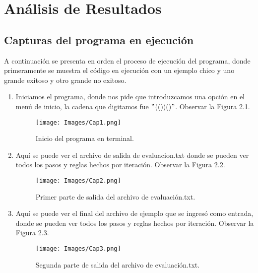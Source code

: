 \chapter{Análisis de Resultados}
\section{Capturas del programa en ejecución}

A continuación se presenta en orden el proceso de ejecución del programa, donde primeramente se muestra el código en ejecución con un ejemplo chico y uno grande exitoso y otro grande no exitoso.\newline
\newpage

\begin{enumerate}
\item Iniciamos el programa, donde nos pide que introduzcamos una opción en el menú de inicio, la cadena que digitamos fue $"$(())()$"$. Observar la Figura 2.1.

\begin{figure}[h]
\begin{minipage}{0.3\textwidth}
    \texttt{[image: Images/Cap1.png]}
\end{minipage}
\caption{Inicio del programa en terminal.}
\label{fig:imagen}
\end{figure}
\newpage
\item Aquí se puede ver el archivo de salida de evaluacion.txt donde se pueden ver todos los pasos y reglas hechos por iteración.  Observar la Figura 2.2.\newline
\begin{figure}[h]
\begin{minipage}{0.3\textwidth}
    \texttt{[image: Images/Cap2.png]}
\end{minipage}
\caption{Primer parte de salida del archivo de evaluación.txt.}
\label{fig:imagen}
\end{figure}

\newpage
\item Aquí se puede ver el final del archivo de ejemplo que se ingresó como entrada, donde se pueden ver todos los pasos y reglas hechos por iteración. Observar la Figura 2.3.
\begin{figure}[h]
\begin{minipage}{0.3\textwidth}
    \texttt{[image: Images/Cap3.png]}
\end{minipage}
\caption{Segunda parte de salida del archivo de evaluación.txt.}
\label{fig:imagen}
\end{figure}


\end{enumerate}
